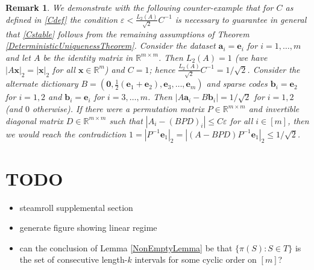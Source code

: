 \documentclass[journal, twocolumn]{IEEEtran}
\newtheorem{remark}{Remark}
\begin{document}
\begin{remark}
We demonstrate with the following counter-example that for $C$ as defined in \eqref{Cdef} the condition $\varepsilon < \frac{L_2(A)}{\sqrt{2}}C^{-1}$ is necessary to guarantee in general that \eqref{Cstable} follows from the remaining assumptions of Theorem \ref{DeterministicUniquenessTheorem}. Consider the dataset $\mathbf{a}_i = \mathbf{e}_i$ for $i = 1, \ldots, m$ and let $A$ be the identity matrix in $\mathbb{R}^{m \times m}$. Then $L_2(A) = 1$ (we have $|A\mathbf{x}|_2 = |\mathbf{x}|_2$ for all $\mathbf{x} \in \mathbb{R}^m$) and $C = 1$; hence $\frac{L_2(A)}{\sqrt{2}}C^{-1} = 1/\sqrt{2}$. Consider the alternate dictionary $B = \left(\mathbf{0}, \frac{1}{2}(\mathbf{e}_1 + \mathbf{e}_2), \mathbf{e}_3, \ldots, \mathbf{e}_{m} \right)$ and sparse codes $\mathbf{b}_i = \mathbf{e}_2$ for $i = 1, 2$ and $\mathbf{b}_i = \mathbf{e}_i$ for $i = 3, \ldots, m$. Then $|A\mathbf{a}_i - B\mathbf{b}_i| = 1/\sqrt{2}$ for $i = 1, 2$ (and $0$ otherwise). If there were a permutation matrix $P \in \mathbb{R}^{m \times m}$ and invertible diagonal matrix $D \in \mathbb{R}^{m \times m}$ such that $|A_i-(BPD)_i| \leq C\varepsilon$ for all $i \in [m]$, then we would reach the contradiction $1 = |P^{-1}\mathbf{e}_1|_2 = |(A-BPD)P^{-1}\mathbf{e}_1|_2 \leq 1/\sqrt{2}$. 
\end{remark}


\section{TODO}
\begin{itemize}
\item steamroll supplemental section
\item generate figure showing linear regime
\item can the conclusion of Lemma \ref{NonEmptyLemma} be that $\{ \pi(S): S \in T \}$ is the set of consecutive length-$k$ intervals for some cyclic order on $[m]$?
\end{itemize}
\end{document}
